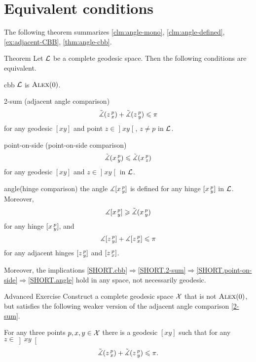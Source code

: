 \section{Equivalent conditions}

The following theorem summarizes \ref{clm:angle-mono}, \ref{clm:angle-defined}, \ref{ex:adjacent-CBB}, \ref{thm:angle-cbb}.

\begin{thm}{Theorem}\label{thm:defs_of_alex} 
Let $\mathcal{L}$ be a complete geodesic space.
Then the following conditions are equivalent.

\begin{subthm}{cbb}
$\mathcal{L}$ is $\textsc{Alex}(0)$.
\end{subthm}
 

\begin{subthm}{2-sum} 
(adjacent angle comparison)
\[\tilde\measuredangle(z\,{}^{p}_{x})
+\tilde\measuredangle(z\,{}^{p}_{y})\leqslant \pi\]
for any geodesic $[x y]$ and point $z\in \mathopen{]}x y\mathclose{[}$, $z\ne p$ in $\mathcal{L}$.
\end{subthm}

\begin{subthm}{point-on-side}
(point-on-side comparison)
\[\tilde\measuredangle(x\,{}^{p}_{y})\leqslant\tilde\measuredangle(x\,{}^{p}_{z})\]
for any geodesic $[x y]$ and $z\in \mathopen{]}x y\mathclose{[}$ in $\mathcal{L}$.
\end{subthm}

\begin{subthm}{angle}(hinge comparison)
the angle $\measuredangle[x\,{}^{p}_{y}]$ is defined for any hinge $[x\,{}^{p}_{y}]$ in $\mathcal{L}$.
Moreover, 
\[\measuredangle[x\,{}^{p}_{y}]\geqslant\tilde\measuredangle(x\,{}^{p}_{y})\]
for any hinge $[x\,{}^{p}_{y}]$, and
\[\measuredangle[z\,{}^{p}_{y}] + \measuredangle[z\,{}^{p}_{x}]\leqslant\pi\]
for any adjacent hinges $[z\,{}^{p}_{y}]$ and $[z\,{}^{p}_{x}]$.
\end{subthm}

Moreover, the implications \ref{SHORT.cbb}$\Rightarrow$\ref{SHORT.2-sum}$\Rightarrow$\ref{SHORT.point-on-side}$\Rightarrow$\ref{SHORT.angle} hold in any space, not necessarily geodesic.
\end{thm}

\begin{thm}{Advanced Exercise}\label{ex:urysohn}
Construct a complete geodesic space $\mathcal{X}$ that is not $\textsc{Alex}(0)$, but satisfies the following weaker version of the adjacent angle comparison \ref{2-sum}.

For any three points $p,x,y\in \mathcal{X}$ there is a geodesic $[x y]$ such that for any $z\in \left]x y\right[$
\[\tilde\measuredangle(z\,{}^{p}_{x})+\tilde\measuredangle(z\,{}^{p}_{y})
\leqslant
\pi.\]
\end{thm}

